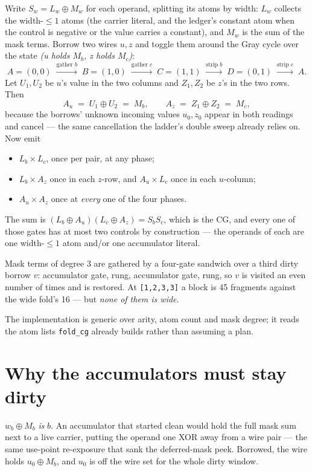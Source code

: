 \documentclass[11pt]{article}
\newcommand{\xor}{\oplus}
\newcommand{\code}[1]{\texttt{#1}}
\begin{document}
Write $S_w = L_w \xor M_w$ for each operand, splitting its atoms by width:
$L_w$ collects the width-$\le\!1$ atoms (the carrier literal, and the ledger's
constant atom when the control is negative or the value carries a constant),
and $M_w$ is the sum of the mask terms. Borrow two wires $u,z$ and toggle them
around the Gray cycle over the state \emph{(u holds $M_b$, z holds $M_c$)}:
\[
  A=(0,0) \;\xrightarrow{\text{gather }b}\; B=(1,0)
          \;\xrightarrow{\text{gather }c}\; C=(1,1)
          \;\xrightarrow{\text{strip }b}\;  D=(0,1)
          \;\xrightarrow{\text{strip }c}\;  A .
\]
Let $U_1,U_2$ be $u$'s value in the two columns and $Z_1,Z_2$ be $z$'s in the
two rows. Then
\[
  A_u \;=\; U_1 \xor U_2 \;=\; M_b, \qquad
  A_z \;=\; Z_1 \xor Z_2 \;=\; M_c ,
\]
because the borrows' unknown incoming values $u_0,z_0$ appear in both readings
and cancel --- the same cancellation the ladder's double sweep already relies
on. Now emit
\begin{itemize}
  \item $L_b \times L_c$, once per pair, at any phase;
  \item $L_b \times A_z$ once in each $z$-row, and $A_u \times L_c$ once in
        each $u$-column;
  \item $A_u \times A_z$ once at \emph{every} one of the four phases.
\end{itemize}
The sum is $(L_b \xor A_u)(L_c \xor A_z) = S_b S_c$, which is the CG, and every
one of those gates has at most two controls by construction --- the operands of
each are one width-$\le\!1$ atom and/or one accumulator literal.

Mask terms of degree 3 are gathered by a four-gate sandwich over a third dirty
borrow $v$: accumulator gate, rung, accumulator gate, rung, so $v$ is visited
an even number of times and is restored. At \code{[1,2,3,3]} a block is 45
fragments against the wide fold's 16 --- but \emph{none of them is wide}.

The implementation is generic over arity, atom count and mask degree; it reads
the atom lists \code{fold\_cg} already builds rather than assuming a plan.

\section{Why the accumulators must stay dirty}

$w_b \xor M_b$ \emph{is} $b$. An accumulator that started clean would hold the
full mask sum next to a live carrier, putting the operand one XOR away from a
wire pair --- the same use-point re-exposure that sank the deferred-mask peek.
Borrowed, the wire holds $u_0 \xor M_b$, and $u_0$ is off the wire set for the
whole dirty window.
\end{document}
